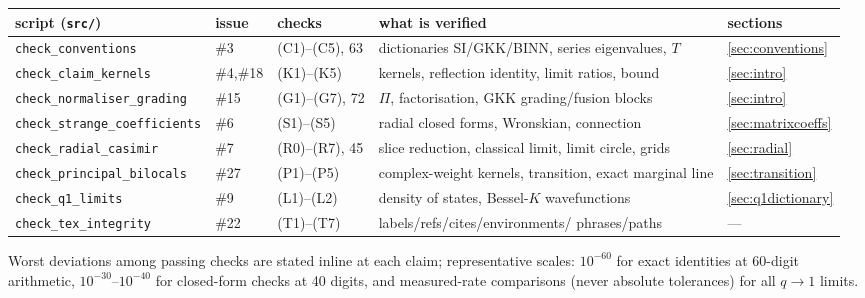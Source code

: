 \documentclass[11pt,a4paper]{article}
\theoremstyle{definition}
\theoremstyle{plain}
\begin{document}
\begin{center}
\small
\begin{tabular}{lllll}
\hline
script (\texttt{src/}) & issue & checks & what is verified & sections\\
\hline
\texttt{check\_conventions} & \#3 & (C1)--(C5), 63 & dictionaries SI/GKK/BINN, series
eigenvalues, $T$ & \ref{sec:conventions}\\
\texttt{check\_claim\_kernels} & \#4,\#18 & (K1)--(K5) & kernels, reflection identity,
limit ratios, bound & \ref{sec:intro}\\
\texttt{check\_normaliser\_grading} & \#15 & (G1)--(G7), 72 & $\Pi$, factorisation, GKK
grading/fusion blocks & \ref{sec:intro}\\
\texttt{check\_strange\_coefficients} & \#6 & (S1)--(S5) & radial closed forms, Wronskian,
connection & \ref{sec:matrixcoeffs}\\
\texttt{check\_radial\_casimir} & \#7 & (R0)--(R7), 45 & slice reduction, classical limit,
limit circle, grids & \ref{sec:radial}\\
\texttt{check\_principal\_bilocals} & \#27 & (P1)--(P5) & complex-weight kernels,
transition, exact marginal line & \ref{sec:transition}\\
\texttt{check\_q1\_limits} & \#9 & (L1)--(L2) & density of states, Bessel-$K$
wavefunctions & \ref{sec:q1dictionary}\\
\texttt{check\_tex\_integrity} & \#22 & (T1)--(T7) & labels/refs/cites/environments/
phrases/paths & ---\\
\hline
\end{tabular}
\end{center}

Worst deviations among passing checks are stated inline at each claim; representative
scales: $10^{-60}$ for exact identities at 60-digit arithmetic, $10^{-30}$--$10^{-40}$ for
closed-form checks at 40 digits, and measured-rate comparisons (never absolute tolerances)
for all $q\to1$ limits.
\end{document}
